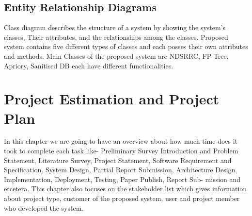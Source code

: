 \documentclass[12pt]{report}
\begin{document}
\clearpage
\justifying
\setlength{\parindent}{4em}
\setlength{\parskip}{0.5em}
\renewcommand{\baselinestretch}{1.5}
\normalsize
\subsection{ Entity Relationship Diagrams}
Class diagram describes the structure of a system by showing the system’s classes, Their
attributes, and the relationships among the classes. Proposed system contains five different 
types of classes and each posses their own attributes and methods. Main Classes of the 
proposed system are NDSRRC, FP Tree, Apriory, Sanitised DB each have different 
functionalities.
\vspace{1.5cm}

\clearpage
\centering
\section{ Project Estimation and Project Plan}
\justifying
\setlength{\parindent}{4em}
\setlength{\parskip}{0.5em}
\renewcommand{\baselinestretch}{1.5}
\normalsize In this chapter we are going to have an overview about how much time does it took to complete each task like- Preliminary Survey Introduction and Problem Statement, Literature Survey, Project Statement, Software Requirement and Specification, System Design, Partial Report Submission, Architecture Design, Implementation, Deployment, Testing, Paper Publish, Report Sub- mission and etcetera. This chapter also focuses on the stakeholder list which gives information about project type, customer of the proposed system, user and project member who developed the system.
\end{document}
